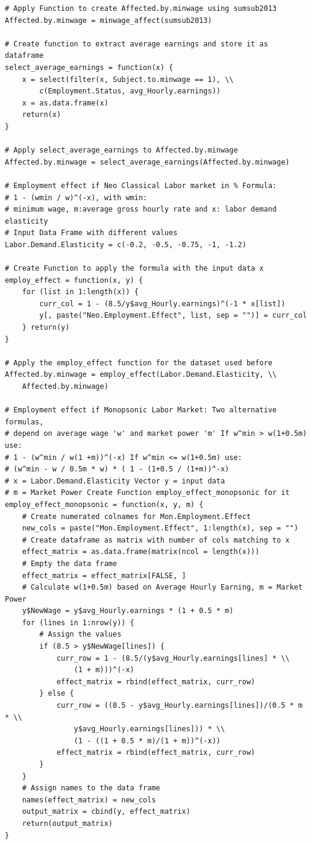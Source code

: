 \documentclass[a4paper]{article}
\begin{document}
{\begin{lstlisting}
# Apply Function to create Affected.by.minwage using sumsub2013
Affected.by.minwage = minwage_affect(sumsub2013)

# Create function to extract average earnings and store it as dataframe
select_average_earnings = function(x) {
    x = select(filter(x, Subject.to.minwage == 1), \\ 
    	c(Employment.Status, avg_Hourly.earnings))
    x = as.data.frame(x)
    return(x)
}

# Apply select_average_earnings to Affected.by.minwage
Affected.by.minwage = select_average_earnings(Affected.by.minwage)

# Employment effect if Neo Classical Labor market in % Formula: 
# 1 - (wmin / w)^(-x), with wmin: 
# minimum wage, m:average gross hourly rate and x: labor demand elasticity 
# Input Data Frame with different values
Labor.Demand.Elasticity = c(-0.2, -0.5, -0.75, -1, -1.2)

# Create Function to apply the formula with the input data x
employ_effect = function(x, y) {
    for (list in 1:length(x)) {
        curr_col = 1 - (8.5/y$avg_Hourly.earnings)^(-1 * x[list])
        y[, paste("Neo.Employment.Effect", list, sep = "")] = curr_col
    } return(y)
}

# Apply the employ_effect function for the dataset used before
Affected.by.minwage = employ_effect(Labor.Demand.Elasticity, \\
	Affected.by.minwage)

# Employment effect if Monopsonic Labor Market: Two alternative formulas, 
# depend on average wage 'w' and market power 'm' If w^min > w(1+0.5m) use: 
# 1 - (w^min / w(1 +m))^(-x) If w^min <= w(1+0.5m) use:
# (w^min - w / 0.5m * w) * ( 1 - (1+0.5 / (1+m))^-x) 
# x = Labor.Demand.Elasticity Vector y = input data
# m = Market Power Create Function employ_effect_monopsonic for it
employ_effect_monopsonic = function(x, y, m) {
    # Create numerated colnames for Mon.Employment.Effect
    new_cols = paste("Mon.Employment.Effect", 1:length(x), sep = "")
    # Create dataframe as matrix with number of cols matching to x
    effect_matrix = as.data.frame(matrix(ncol = length(x)))
    # Empty the data frame
    effect_matrix = effect_matrix[FALSE, ]
    # Calculate w(1+0.5m) based on Average Hourly Earning, m = Market Power
    y$NewWage = y$avg_Hourly.earnings * (1 + 0.5 * m)
    for (lines in 1:nrow(y)) {
        # Assign the values
        if (8.5 > y$NewWage[lines]) {
            curr_row = 1 - (8.5/(y$avg_Hourly.earnings[lines] * \\ 
            	(1 + m)))^(-x)
            effect_matrix = rbind(effect_matrix, curr_row)
        } else {
            curr_row = ((8.5 - y$avg_Hourly.earnings[lines])/(0.5 * m * \\
            	y$avg_Hourly.earnings[lines])) * \\
                (1 - ((1 + 0.5 * m)/(1 + m))^(-x))
            effect_matrix = rbind(effect_matrix, curr_row)
        }
    }
    # Assign names to the data frame
    names(effect_matrix) = new_cols
    output_matrix = cbind(y, effect_matrix)
    return(output_matrix)
}


\end{lstlisting}}
\end{document}
